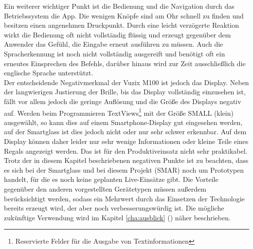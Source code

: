 Ein weiterer wichtiger Punkt ist die Bedienung und die Navigation durch das Betriebssystem \bzw die App. Die wenigen Knöpfe sind am Ohr schnell zu finden und besitzen einen angenehmen Druckpunkt. Durch eine leicht verzögerte Reaktion wirkt die Bedienung oft nicht vollständig flüssig und erzeugt gegenüber dem Anwender das Gefühl, die Eingabe erneut ausführen zu müssen. Auch die Spracherkennung ist noch nicht vollständig ausgereift und benötigt oft ein erneutes Einsprechen des Befehls, darüber hinaus wird zur Zeit ausschließlich die englische Sprache unterstützt.\\

Der entscheidende Negativmerkmal der Vuzix M100 ist jedoch das Display. Neben der langwierigen Justierung der Brille, bis das Display vollständig einzusehen ist, fällt vor allem jedoch die geringe Auflösung und die Größe des Displays negativ auf. Werden beim Programmieren TextViews\footnote{Reservierte Felder für die Ausgabe von Textinformationen} mit der Größe SMALL (klein) ausgewählt, so kann dies auf einem Smartphone-Display gut eingesehen werden, auf der Smartglass ist dies jedoch nicht oder nur sehr schwer erkennbar. Auf dem Display können daher leider nur sehr wenige Informationen oder kleine Teile eines Regals angezeigt werden. Das ist für den Produktiveinsatz nicht sehr praktikabel.\\

Trotz der in diesem Kapitel beschriebenen negativen Punkte ist zu beachten, dass es sich bei der Smartglass und bei diesem Projekt (\acs{SMAR}) noch um Prototypen handelt, für die es noch keine geplanten Live-Einsätze gibt. Die Vorteile gegenüber den anderen vorgestellten Gerätetypen müssen außerdem berücksichtigt werden, sodass ein Mehrwert durch das Einsetzen der Technologie bereits erzeugt wird, der aber noch verbesserungswürdig ist.
Die mögliche zukünftige Verwendung wird im Kapitel \ref{cha:ausblick} () näher beschrieben.